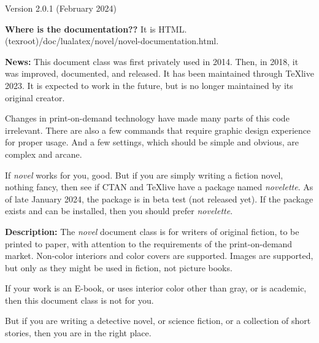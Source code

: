 \documentclass{novel} %
\begin{document}
\thispagestyle{empty}
\begin{ChapterStart}[8]
\vspace{\nbs} %
\vspace{\nbs}
{\centering Version 2.0.1 (February 2024)\par}
\end{ChapterStart}

\textbf{Where is the documentation??} It is HTML.\\
(texroot)/doc/lualatex/novel/novel-documentation.html.

\scenebreak

\textbf{News:} This document class was first privately used in 2014.
Then, in 2018, it was improved, documented, and released. It has been
maintained through TeXlive 2023. It is expected to work in the future, but is
no longer maintained by its original creator.\par
Changes in print-on-demand technology have made many parts of this code
irrelevant. There are also a few commands that require graphic design
experience for proper usage. And a few settings, which should be simple and
obvious, are complex and arcane.\par
If \emph{novel} works for you, good. But if you are simply writing a fiction
novel, nothing fancy, then see if CTAN and TeXlive have a package named
\emph{novelette}. As of late January 2024, the package is in beta test
(not released yet). If the package exists and can be installed, then you
should prefer \emph{novelette}. 

\scenebreak

\textbf{Description:} The \emph{novel} document class is for writers of
original fiction, to be printed to paper, with attention to the requirements
of the print-on-demand market. Non-color interiors and color covers are
supported. Images are supported, but only as they might be used in fiction,
not picture books.

If your work is an E-book, or uses interior color other than gray, or is
academic, then this document class is not for you. 

But if you are writing a detective novel, or science fiction, or a collection
of short stories, then you are in the right place.

\makeatletter\nocle@rtoendtrue\makeatother %
\end{document}
